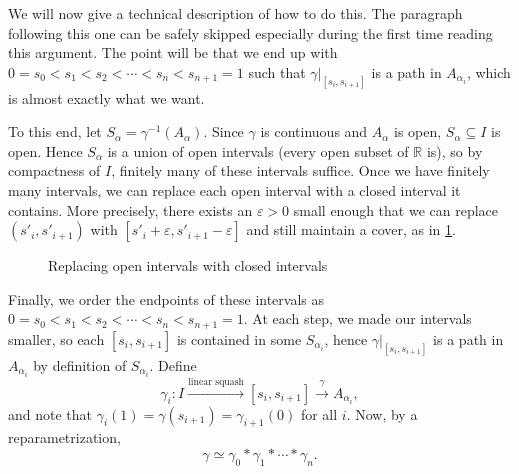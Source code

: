 \documentclass{article}
\theoremstyle{definition}
\theoremstyle{remark}
\newcommand{\R}{\mathbb R}
\numberwithin{figure}{section}
\begin{document}

We will now give a technical description of how to do this. The paragraph following this one can be safely skipped especially during the first time reading this argument. The point will be that we end up with $0 = s_0 < s_1 < s_2 < \cdots < s_n < s_{n + 1} = 1$ such that $\gamma|_{[s_i, s_{i + 1}]}$ is a path in $A_{\alpha_i}$, which is almost exactly what we want.

To this end, let $S_\alpha = \gamma^{-1}(A_\alpha)$. Since $\gamma$ is continuous and $A_\alpha$ is open, $S_\alpha \subseteq I$ is open. Hence $S_\alpha$ is a union of open intervals (every open subset of $\R$ is), so by compactness of $I$, finitely many of these intervals suffice. Once we have finitely many intervals, we can replace each open interval with a closed interval it contains. More precisely, there exists an $\varepsilon > 0$ small enough that we can replace $(s'_i, s'_{i + 1})$ with $[s'_i + \varepsilon, s'_{i + 1} - \varepsilon]$ and still maintain a cover, as in \cref{fig:open to closed interval}.

\begin{figure}[h]
	\centering
	\caption{Replacing open intervals with closed intervals}
	\label{fig:open to closed interval}
\end{figure}

Finally, we order the endpoints of these intervals as $0 = s_0 < s_1 < s_2 < \cdots < s_n < s_{n + 1} = 1$. At each step, we made our intervals smaller, so each $[s_i, s_{i + 1}]$ is contained in some $S_{\alpha_i}$, hence $\gamma|_{[s_i, s_{i + 1}]}$ is a path in $A_{\alpha_i}$ by definition of $S_{\alpha_i}$. Define
\[
\gamma_i : I \xrightarrow{\text{linear squash}} [s_i, s_{i + 1}] \overset{\gamma}{\longrightarrow} A_{\alpha_i},
\]
and note that $\gamma_i(1) = \gamma(s_{i + 1}) = \gamma_{i + 1}(0)$ for all $i$. Now, by a reparametrization,
\[
\gamma \simeq \gamma_0 * \gamma_1 * \cdots * \gamma_n.
\]
\end{document}

